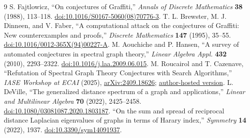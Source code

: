 \documentclass[10pt,twocolumn]{article}
\begin{document}
\begin{thebibliography}{9}\small
{} S. Fajtlowicz, ``On conjectures of Graffiti,'' \emph{Annals of Discrete Mathematics} \textbf{38} (1988), 113--118. \href{https://doi.org/10.1016/S0167-5060(08)70776-3}{doi:10.1016/S0167-5060(08)70776-3}.
 T. L. Brewster, M. J. Dinneen, and V. Faber, ``A computational attack on the conjectures of Graffiti: New counterexamples and proofs,'' \emph{Discrete Mathematics} \textbf{147} (1995), 35--55. \href{https://doi.org/10.1016/0012-365X(94)00227-A}{doi:10.1016/0012-365X(94)00227-A}.
 M. Aouchiche and P. Hansen, ``A survey of automated conjectures in spectral graph theory,'' \emph{Linear Algebra Appl.} \textbf{432} (2010), 2293--2322. \href{https://doi.org/10.1016/j.laa.2009.06.015}{doi:10.1016/j.laa.2009.06.015}.
 M. Roucairol and T. Cazenave, ``Refutation of Spectral Graph Theory Conjectures with Search Algorithms,'' \emph{IASE Workshop at ECAI} (2025), \href{https://arxiv.org/abs/2409.18626}{arXiv:2409.18626}; \href{https://www.lamsade.dauphine.fr/~cazenave/papers/ConjectureRefutationECAI2025.pdf}{author-hosted version}.
 L. DeVille, ``The generalized distance spectrum of a graph and applications,'' \emph{Linear and Multilinear Algebra} \textbf{70} (2022), 2425--2458. \href{https://doi.org/10.1080/03081087.2020.1803187}{doi:10.1080/03081087.2020.1803187}.
 ``On the sum and spread of reciprocal distance Laplacian eigenvalues of graphs in terms of Harary index,'' \emph{Symmetry} \textbf{14} (2022), 1937. \href{https://doi.org/10.3390/sym14091937}{doi:10.3390/sym14091937}.
\end{thebibliography}
\end{document}
